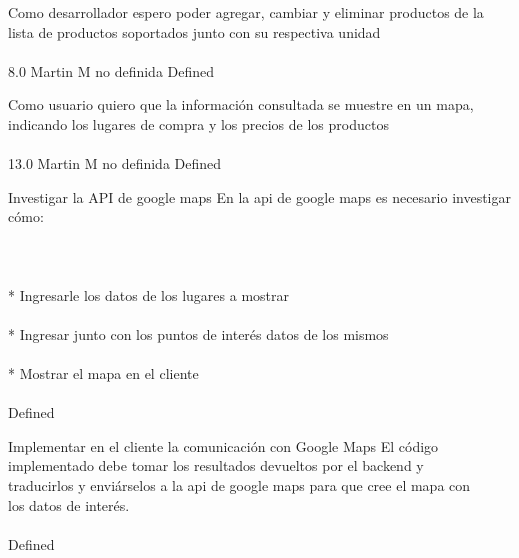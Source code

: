 \vspace{20pt}

	{Como desarrollador espero poder agregar, cambiar y eliminar productos de la lista de productos soportados junto con su respectiva unidad} %
	{\\
\\
} %
	{} %
	{8.0} %
	{Martin M} %
	{no definida} %
	{Defined} %


\vspace{20pt}

	{Como usuario quiero que la información consultada se muestre en un mapa, indicando los lugares de compra y los precios de los productos} %
	{\\
\\
} %
	{} %
	{13.0} %
	{Martin M} %
	{no definida} %
	{Defined} %

		{Investigar la API de google maps} %
		{En la api de google maps es necesario investigar cómo:\\
\\
  \\
\\
* Ingresarle los datos de los lugares a mostrar\\
\\
* Ingresar junto con los puntos de interés datos de los mismos\\
\\
* Mostrar el mapa en el cliente\\
\\
} %
		{} %
		{} %
		{} %
		{Defined} %

		{Implementar en el cliente la comunicación con Google Maps} %
		{El código implementado debe tomar los resultados devueltos por el backend y\\
traducirlos y enviárselos a la api de google maps para que cree el mapa con\\
los datos de interés.\\
\\
} %
		{} %
		{} %
		{} %
		{Defined} %

